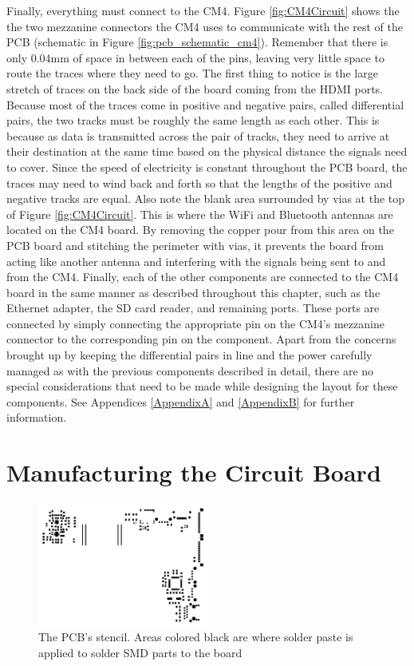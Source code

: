 Finally, everything must connect to the CM4.
Figure \ref{fig:CM4Circuit} shows the the two mezzanine connectors the CM4 uses to communicate with the rest of the PCB (schematic in Figure \ref{fig:pcb_schematic_cm4}).
Remember that there is only 0.04mm of space in between each of the pins, leaving very little space to route the traces where they need to go.
The first thing to notice is the large stretch of traces on the back side of the board coming from the HDMI ports.
Because most of the traces come in positive and negative pairs, called differential pairs, the two tracks must be roughly the same length as each other.
This is because as data is transmitted across the pair of tracks, they need to arrive at their destination at the same time based on the physical distance the signals need to cover.
Since the speed of electricity is constant throughout the PCB board, the traces may need to wind back and forth so that the lengths of the positive and negative tracks are equal.
Also note the blank area surrounded by vias at the top of Figure \ref{fig:CM4Circuit}.
This is where the WiFi and Bluetooth antennas are located on the CM4 board.
By removing the copper pour from this area on the PCB board and stitching the perimeter with vias, it prevents the board from acting like another antenna and interfering with the signals being sent to and from the CM4.
Finally, each of the other components are connected to the CM4 board in the same manner as described throughout this chapter, such as the Ethernet adapter, the SD card reader, and remaining ports.
These ports are connected by simply connecting the appropriate pin on the CM4's mezzanine connector to the corresponding pin on the component.
Apart from the concerns brought up by keeping the differential pairs in line and the power carefully managed as with the previous components described in detail, there are no special considerations that need to be made while designing the layout for these components.
See Appendices \ref{AppendixA} and \ref{AppendixB} for further information.


\section{Manufacturing the Circuit Board}\label{sec:ManufacturingThePCB}

\begin{figure}[t]
  \centering
  \includegraphics[width=0.5\textwidth]{Figures/kicad/close-ups/stencil}
  \caption[PCB Stencil]{The PCB's stencil. Areas colored black are where solder paste is applied to solder SMD parts to the board}
  \label{fig:PCBStencil}
\end{figure}

